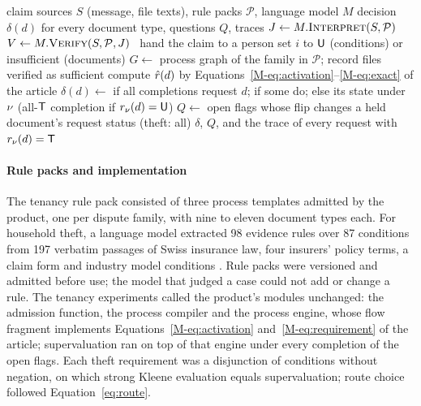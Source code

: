\begin{algorithm}[t]
\caption{The Study~1 configuration decided the evidence plan of one claim.}
\label{alg:agent}
\small
\begin{algorithmic}[1]
\Require claim sources $S$ (message, file texts), rule packs $\mathcal{P}$, language model $M$
\Ensure decision $\delta(d)$ for every document type, questions $Q$, traces
\State $J \gets M.\textsc{Interpret}(S,\mathcal{P})$ 
\State $V \gets M.\textsc{Verify}(S,\mathcal{P},J)$ 
\ \Return hand the claim to a person \EndIf
{} 
     \State set $i$ to $\mathsf{U}$ (conditions) or insufficient (documents)
  \EndIf
\EndFor
\State $G \gets$ process graph of the family in $\mathcal{P}$; record files verified as sufficient
  \State compute $\hat r(d)$ by Equations~\eqref{M-eq:activation}--\eqref{M-eq:exact} of the article
  \State $\delta(d)\gets$ \request if all completions request $d$; \hold if some do; else its state under $\nu$ (all-$\mathsf{T}$ completion if $r_\nu(d)=\mathsf{U}$)
\EndFor
\State $Q\gets$ open flags whose flip changes a held document's request status (theft: all)
\State \Return $\delta$, $Q$, and the trace of every request with $r_\nu(d)=\mathsf{T}$
\end{algorithmic}
\end{algorithm}

\paragraph{Rule packs and implementation}
The tenancy rule pack consisted of three process templates admitted by the product, one per dispute family, with nine to eleven document types each. For household theft, a language model extracted 98 evidence rules over 87 conditions from 197 verbatim passages of Swiss insurance law, four insurers' policy terms, a claim form and industry model conditions \cite{casepath2026repo}. Rule packs were versioned and admitted before use; the model that judged a case could not add or change a rule. The tenancy experiments called the product's modules unchanged: the admission function, the process compiler and the process engine, whose flow fragment implements Equations~\eqref{M-eq:activation} and~\eqref{M-eq:requirement} of the article; supervaluation ran on top of that engine under every completion of the open flags. Each theft requirement was a disjunction of conditions without negation, on which strong Kleene evaluation equals supervaluation; route choice followed Equation~\eqref{eq:route}.

